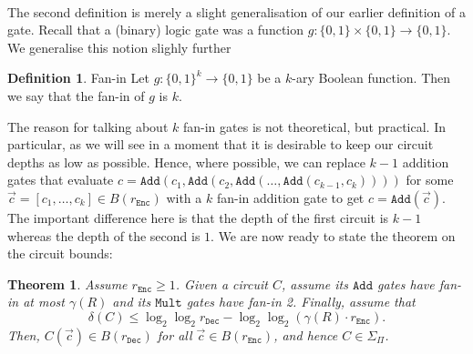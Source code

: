 \documentclass{article}
\newtheorem{theorem}{Theorem}[section]
\theoremstyle{definition}
\newtheorem{definition}{Definition}[section]
\theoremstyle{example}
\newcommand{\Enc}{\texttt{Enc}}
\newcommand{\Dec}{\texttt{Dec}}
\newcommand{\Add}{\texttt{Add}}
\newcommand{\Mult}{\texttt{Mult}}
\begin{document}
\paragraph{} The second definition is merely a slight generalisation of our earlier
definition of a gate. Recall that a (binary) logic gate was a function $g: \{0,
1\} \times \{0, 1\} \to \{0, 1\}$. We generalise this notion slighly further
\begin{definition}{Fan-in}
  Let $g: \{0, 1\}^k \to \{0, 1\}$ be a $k$-ary Boolean function. Then we say
  that the fan-in of $g$ is $k$. 
\end{definition}
The reason for talking about $k$ fan-in gates is not theoretical, but practical.
In particular, as we will see in a moment that it is desirable to keep our
circuit depths as low as possible. Hence, where possible, we can replace $k - 1$
addition gates that evaluate $c = \Add(c_1, \Add(c_2, \Add(\hdots, \Add(c_{k-1},
c_{k}))))$ for some $\vec{c} = [c_1, \hdots, c_k] \in B(r_\Enc)$ with a $k$
fan-in addition gate to get $c = \Add(\vec{c})$. The important difference here
is that the depth of the first circuit is $k-1$ whereas the depth of the second
is $1$.
We are now ready to state the theorem on the circuit bounds:
\begin{theorem}
  Assume $r_\Enc \geq 1$. Given a circuit $C$, assume its $\Add$ gates have
  fan-in at most $\gamma(R)$ and its $\Mult$ gates have fan-in 2.
  Finally, assume that
  \[
    \delta(C) \leq \log_2\log_2 r_\Dec - \log_2\log_2(\gamma(R) \cdot r_\Enc).
  \]
  Then, $C(\vec{c}) \in B(r_\Dec)$ for all $\vec{c} \in B(r_\Enc)$, and hence $C
  \in \Sigma_\Pi$.
\end{theorem}
\end{document}
